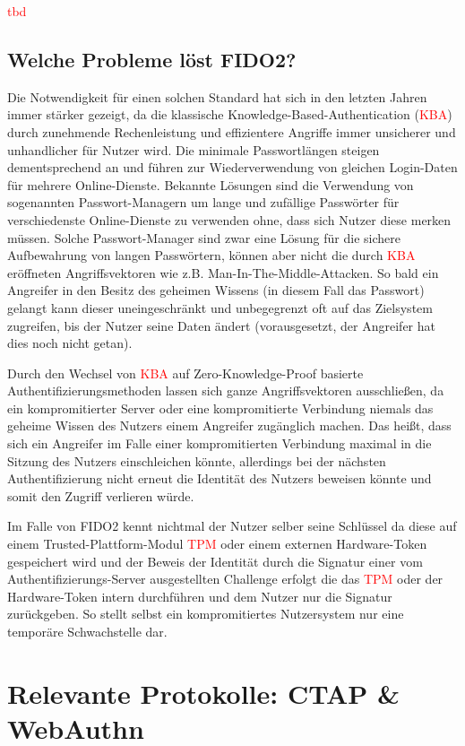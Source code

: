 \documentclass[journal]{IEEEtran}
\begin{document}
\textcolor{red}{tbd}

\subsection{Welche Probleme löst FIDO2?}

Die Notwendigkeit für einen solchen Standard hat sich in den letzten Jahren
immer stärker gezeigt, da die klassische Knowledge-Based-Authentication
(\textcolor{red}{KBA})
durch zunehmende Rechenleistung und effizientere Angriffe immer unsicherer und
unhandlicher für Nutzer wird. Die minimale Passwortlängen steigen
dementsprechend an und führen zur Wiederverwendung von gleichen Login-Daten für
mehrere Online-Dienste. Bekannte Lösungen sind die Verwendung von sogenannten
Passwort-Managern um lange und zufällige Passwörter für verschiedenste
Online-Dienste zu verwenden ohne, dass sich Nutzer diese merken müssen. Solche
Passwort-Manager sind zwar eine Lösung für die sichere Aufbewahrung von langen
Passwörtern, können aber nicht die durch \textcolor{red}{KBA} eröffneten
Angriffsvektoren wie z.B. Man-In-The-Middle-Attacken. So bald ein Angreifer
in den Besitz des geheimen Wissens (in diesem Fall das Passwort) gelangt kann
dieser uneingeschränkt und unbegegrenzt oft auf das Zielsystem zugreifen, bis
der Nutzer seine Daten ändert (vorausgesetzt, der Angreifer hat dies noch nicht
getan).

Durch den Wechsel von \textcolor{red}{KBA} auf Zero-Knowledge-Proof basierte
Authentifizierungsmethoden lassen sich ganze Angriffsvektoren ausschließen, da
ein kompromitierter Server oder eine kompromitierte Verbindung niemals das
geheime Wissen des Nutzers einem Angreifer zugänglich machen. Das heißt, dass
sich ein Angreifer im Falle einer kompromitierten Verbindung maximal in die
Sitzung des Nutzers einschleichen könnte, allerdings bei der nächsten
Authentifizierung nicht erneut die Identität des Nutzers beweisen könnte und
somit den Zugriff verlieren würde.

Im Falle von FIDO2 kennt nichtmal der Nutzer selber seine Schlüssel da diese
auf einem Trusted-Plattform-Modul \textcolor{red}{TPM} oder einem externen
Hardware-Token gespeichert wird und der Beweis der Identität durch die Signatur
einer vom Authentifizierungs-Server ausgestellten Challenge erfolgt die das
\textcolor{red}{TPM} oder der Hardware-Token intern durchführen und dem Nutzer
nur die Signatur zurückgeben. So stellt selbst ein kompromitiertes Nutzersystem
nur eine temporäre Schwachstelle dar.


\section{Relevante Protokolle: CTAP \& WebAuthn}
\end{document}
